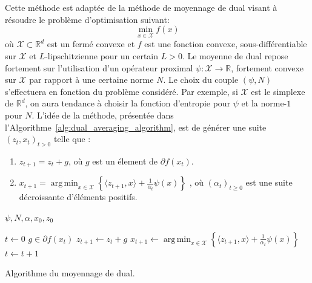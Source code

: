 \documentclass[a4paper]{article}
\DeclareMathOperator*{\argmin}{arg\,min}
\begin{document}
Cette méthode est adaptée de la méthode de moyennage de dual visant à résoudre
le problème d'optimisation suivant:
\begin{equation}
    \label{eq:optimisation_convexe}
    \min_{x \in \mathcal{X}} f(x)
\end{equation}
où $\mathcal{X} \subset \mathbb{R}^d$ est un fermé convexe et $f$ est une
fonction convexe, sous-différentiable sur $\mathcal{X}$ et $L$-lipschitzienne
pour un certain $L > 0$. Le moyenne de dual repose fortement sur l'utilisation
d'un opérateur proximal $\psi : \mathcal{X} \rightarrow \mathbb{R}$, fortement
convexe sur $\mathcal{X}$ par rapport à une certaine norme $N$. Le choix du
couple $(\psi, N)$ s'effectuera en fonction du problème considéré. Par exemple,
si $\mathcal{X}$ est le simplexe de $\mathbb{R}^d$, on aura tendance à choisir
la fonction d'entropie pour $\psi$ et la norme-$1$ pour $N$. L'idée de la
méthode, présentée dans l'Algorithme~\ref{alg:dual_averaging_algorithm},
est de générer une suite $(z_t, x_t)_{t>0}$ telle que :
\begin{enumerate}
    \item $z_{t+1} = z_t + g$, où $g$ est un élement de $\partial f(x_t)$.
    \item $x_{t + 1} = 
        \argmin_{x \in \mathcal{X}}
        \left\{ \langle z_{t + 1}, x \rangle + \frac{1}{\alpha_t} \psi(x)\right\}$
        , où $(\alpha_t)_{t \geq 0}$ est une suite décroissante d'éléments positifs.
\end{enumerate}

\begin{algorithm}[h]
    \begin{algorithmic}
        \Require $\psi, N, \mathbb{\alpha}, x_0, z_0$

        \State $t \gets 0$
        \State $g \in \partial f(x_t)$
        \State $z_{t + 1} \gets z_t + g$
        \State $x_{t + 1} \gets
        \argmin_{x \in \mathcal{X}}
        \left\{ \langle z_{t + 1}, x \rangle + \frac{1}{\alpha_t} \psi(x)\right\}$
        \State $t \gets t + 1$
        \EndWhile
    \end{algorithmic}
    \caption{Algorithme du moyennage de dual.}
    \label{alg:dual_averaging_algorithm}
\end{algorithm}
\end{document}
